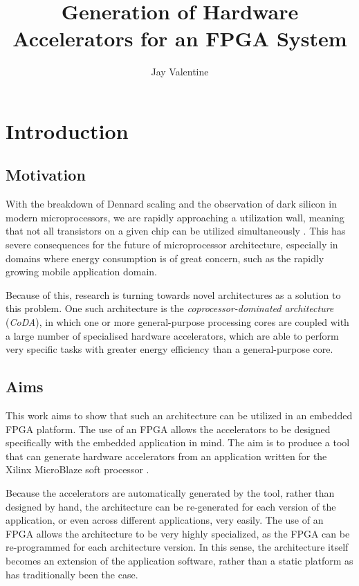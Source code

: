 \documentclass{UoYCSproject}
\begin{document}
\title{Generation of Hardware Accelerators for an FPGA System}
\author{Jay Valentine}

\maketitle

\begin{abstract}
\end{abstract}

\chapter{Introduction}

\section{Motivation}

With the breakdown of Dennard scaling and the observation of dark silicon in modern microprocessors,
we are rapidly approaching a utilization wall, meaning that not all transistors on a given chip can be utilized
simultaneously \cite{darksilicon}. This has severe consequences for the future of microprocessor architecture,
especially in domains where energy consumption is of great concern, such as the rapidly growing mobile application domain.

Because of this, research is turning towards novel architectures as a solution to this problem.
One such architecture is the \textit{coprocessor-dominated architecture} (\textit{CoDA}), in which one or more general-purpose
processing cores are coupled with a large number of specialised hardware accelerators, which are able to perform very specific
tasks with greater energy efficiency than a general-purpose core.

\section{Aims}

This work aims to show that such an architecture can be utilized in an embedded FPGA platform.
The use of an FPGA allows the accelerators to be designed specifically with the embedded application in mind.
The aim is to produce a tool that can generate hardware accelerators from an application written for the Xilinx MicroBlaze
soft processor \cite{microblaze}.

Because the accelerators are automatically generated by the tool, rather than designed by hand, the architecture
can be re-generated for each version of the application, or even across different applications, very easily.
The use of an FPGA allows the architecture to be very highly specialized, as the FPGA can be re-programmed for each architecture
version. In this sense, the architecture itself becomes an extension of the application software, rather than a static
platform as has traditionally been the case.
\end{document}
